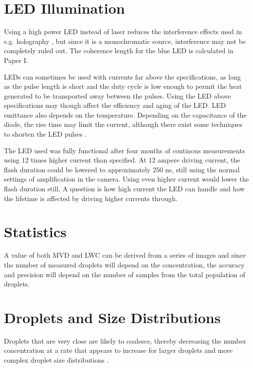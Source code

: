 \section{LED Illumination}

Using a high power LED instead of laser reduces the interference effects used in e.g. holography \cite{henn2013}, but since it is a monochromatic source, interference may not be completely ruled out. The coherence length for the blue LED is calculated in Paper I.

LEDs can sometimes be used with currents far above the specifications, as long as the pulse length is short and the duty cycle is low enough to permit the heat generated to be transported away between the pulses. Using the LED above specifications may though affect the efficiency and aging of the LED. LED emittance also depends on the temperature. Depending on the capacitance of the diode, the rise time may limit the current, although there exist some techniques to shorten the LED pulses \cite{tanaka2011,vele2007}.

The LED used was fully functional after four months of continous measurements using 12 times higher current than specified. At 12 ampere driving current, the flash duration could be lowered to approximately 250 ns, still using the normal settings of amplification in the camera. Using even higher current would lower the flash duration still. A question is how high current the LED can handle and how the lifetime is affected by driving higher currents through.

\section{Statistics}

A value of both MVD and LWC can be derived from a series of images and since the number of measured droplets will depend on the concentration, the accuracy and precision will depend on the number of samples from the total population of droplets. 



\section{Droplets and Size Distributions}

Droplets that are very close are likely to coalesce, thereby decreasing the number concentration at a rate that appears to increase for larger droplets and more complex droplet size distributions \cite{borda2011}. 

